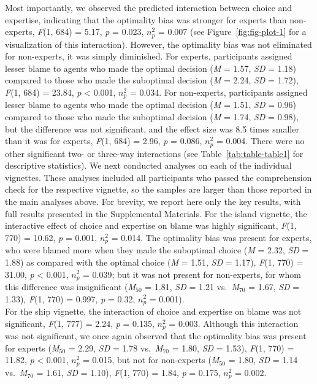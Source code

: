 \documentclass[
  man,floatsintext]{apa6}
\begin{document}
Most importantly, we observed the predicted interaction between choice and expertise, indicating that the optimality bias was stronger for experts than non-experts, \emph{F}(1, 684) = 5.17, \emph{p} = 0.023, \(n^2_p\) = 0.007 (see Figure~\ref{fig:fig-plot-1} for a visualization of this interaction). However, the optimality bias was not eliminated for non-experts, it was simply diminished. For experts, participants assigned lesser blame to agents who made the optimal decision (\emph{M} = 1.57, \emph{SD} = 1.18) compared to those who made the suboptimal decision (\emph{M} = 2.24, \emph{SD} = 1.72), \emph{F}(1, 684) = 23.84, \emph{p} \textless{} 0.001, \(n^2_p\) = 0.034. For non-experts, participants assigned lesser blame to agents who made the optimal decision (\emph{M} = 1.51, \emph{SD} = 0.96) compared to those who made the suboptimal decision (\emph{M} = 1.74, \emph{SD} = 0.98), but the difference was not significant, and the effect size was 8.5 times smaller than it was for experts, \emph{F}(1, 684) = 2.96, \emph{p} = 0.086, \(n^2_p\) = 0.004. There were no other significant two- or three-way interactions (see Table~\ref{tab:table-table1} for descriptive statistics). We next conducted analyses on each of the individual vignettes. These analyses included all participants who passed the comprehension check for the respective vignette, so the samples are larger than those reported in the main analyses above. For brevity, we report here only the key results, with full results presented in the Supplemental Materials. For the island vignette, the interactive effect of choice and expertise on blame was highly significant, \emph{F}(1, 770) = 10.62, \emph{p} = 0.001, \(n^2_p\) = 0.014. The optimality bias was present for experts, who were blamed more when they made the suboptimal choice (\emph{M} = 2.32, \emph{SD} = 1.88) as compared with the optimal choice (\emph{M} = 1.51, \emph{SD} = 1.17), \emph{F}(1, 770) = 31.00, \emph{p} \textless{} 0.001, \(n^2_p\) = 0.039; but it was not present for non-experts, for whom this difference was insignificant (\emph{M}\(_{50}\) = 1.81, \emph{SD} = 1.21 vs.~\emph{M}\(_{70}\) = 1.67, \emph{SD} = 1.33), \emph{F}(1, 770) = 0.997, \emph{p} = 0.32, \(n^2_p\) = 0.001).\\
For the ship vignette, the interaction of choice and expertise on blame was not significant, \emph{F}(1, 777) = 2.24, \emph{p} = 0.135, \(n^2_p\) = 0.003. Although this interaction was not significant, we once again observed that the optimality bias was present for experts (\emph{M}\(_{50}\) = 2.29, \emph{SD} = 1.78 vs.~\emph{M}\(_{70}\) = 1.80, \emph{SD} = 1.53), \emph{F}(1, 770) = 11.82, \emph{p} \textless{} 0.001, \(n^2_p\) = 0.015, but not for non-experts (\emph{M}\(_{50}\) = 1.80, \emph{SD} = 1.14 vs.~\emph{M}\(_{70}\) = 1.61, \emph{SD} = 1.10), \emph{F}(1, 770) = 1.84, \emph{p} = 0.175, \(n^2_p\) = 0.002.\\
\end{document}
